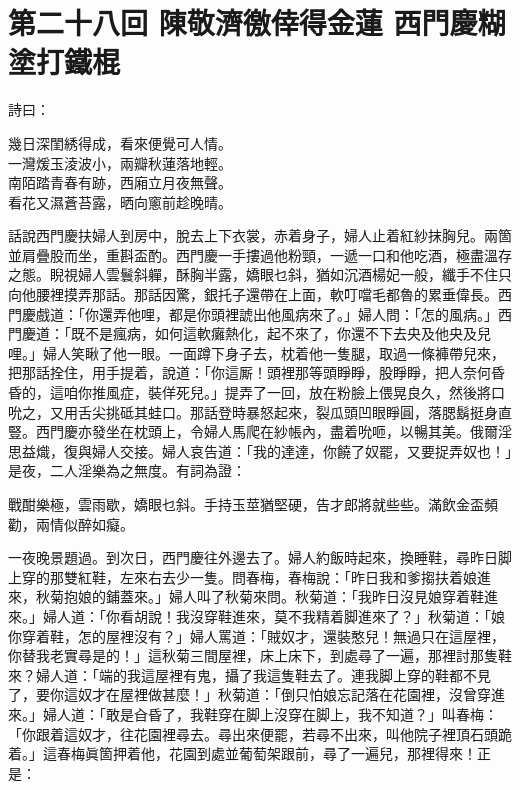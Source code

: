 
\chapter*{第二十八回 陳敬濟徼倖得金蓮 西門慶糊塗打鐵棍}


詩曰：

\begin{myquote}
幾日深閨綉得成，看來便覺可人情。\\一灣煖玉淩波小，兩瓣秋蓮落地輕。\\南陌踏青春有跡，西廂立月夜無聲。\\看花又濕蒼苔露，晒向窻前趁晚晴。
\end{myquote}

話說西門慶扶婦人到房中，脫去上下衣裳，赤着身子，婦人止着紅紗抹胸兒。{}兩箇並肩疊股而坐，重斟盃酌。西門慶一手摟過他粉頸，一遞一口和他吃酒，極盡溫存之態。睨視婦人雲鬟斜軃，酥胸半露，嬌眼乜斜，猶如沉酒楊妃一般，{}纖手不住只向他腰裡摸弄那話。那話因驚，銀托子還帶在上面，軟叮噹毛都魯的累垂偉長。西門慶戲道：「你還弄他哩，都是你頭裡諕出他風病來了。」婦人問：「怎的風病。」西門慶道：「既不是瘋病，如何這軟癱熱化，起不來了，你還不下去央及他央及兒哩。」婦人笑瞅了他一眼。一面蹲下身子去，枕着他一隻腿，取過一條褲帶兒來，把那話拴住，用手提着，說道：「你這厮！頭裡那等頭睜睜，股睜睜，把人奈何昏昏的，這咱你推風症，裝佯死兒。」{}提弄了一回，放在粉臉上偎晃良久，然後將口吮之，又用舌尖挑砥其蛙口。那話登時暴怒起來，裂瓜頭凹眼睜圓，落腮鬍挺身直豎。西門慶亦發坐在枕頭上，令婦人馬爬在紗帳內，盡着吮咂，以暢其美。俄爾淫思益熾，復與婦人交接。婦人哀告道：「我的達達，你饒了奴罷，又要捉弄奴也！」是夜，二人淫樂為之無度。有詞為證：

\begin{myquote}
戰酣樂極，雲雨歇，嬌眼乜斜。手持玉莖猶堅硬，告才郎將就些些。滿飲金盃頻勸，兩情似醉如癡。
\end{myquote}

一夜晚景題過。到次日，西門慶往外邊去了。婦人約飯時起來，換睡鞋，尋昨日脚上穿的那雙紅鞋，左來右去少一隻。問春梅，春梅說：「昨日我和爹搊扶着娘進來，秋菊抱娘的鋪蓋來。」婦人叫了秋菊來問。秋菊道：「我昨日沒見娘穿着鞋進來。」婦人道：「你看胡說！我沒穿鞋進來，莫不我精着脚進來了？」秋菊道：「娘你穿着鞋，怎的屋裡沒有？」{}婦人罵道：「賊奴才，還裝憨兒！無過只在這屋裡，你替我老實尋是的！」這秋菊三間屋裡，床上床下，到處尋了一遍，那裡討那隻鞋來？婦人道：「端的我這屋裡有鬼，攝了我這隻鞋去了。連我脚上穿的鞋都不見了，要你這奴才在屋裡做甚麼！」秋菊道：「倒只怕娘忘記落在花園裡，沒曾穿進來。」婦人道：「敢是㒲昏了，{}我鞋穿在脚上沒穿在脚上，我不知道？」叫春梅：「你跟着這奴才，往花園裡尋去。尋出來便罷，若尋不出來，叫他院子裡頂石頭跪着。」這春梅眞箇押着他，花園到處並葡萄架跟前，尋了一遍兒，那裡得來！正是：

